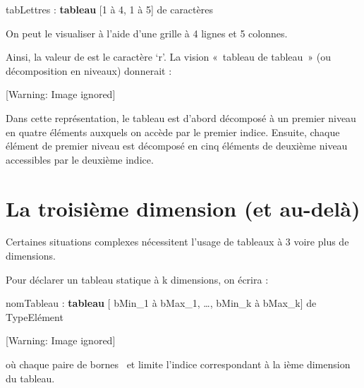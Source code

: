 {\sffamily
tabLettres : \textbf{tableau }[1 à 4, 1 à 5] de caractères}

{
On peut le visualiser à l’aide d’une grille à 4 lignes et 5 colonnes.}

{%
 \par}

{
Ainsi, la valeur de  est le caractère
‘r’. La vision «~tableau de tableau~» (ou décomposition en niveaux)
donnerait :}

  [Warning: Image ignored] %
 

{
Dans cette représentation, le tableau  est
d’abord décomposé à un premier niveau en quatre éléments auxquels on
accède par le premier indice. Ensuite, chaque élément de premier niveau
est décomposé en cinq éléments de deuxième niveau accessibles par le
deuxième indice.}

\section{La troisième dimension (et au-delà)}
{
Certaines situations complexes nécessitent l'usage de
tableaux à 3 voire plus de dimensions.}

{
Pour déclarer un tableau statique à k dimensions, on écrira :}

{\sffamily
nomTableau : \textbf{tableau} [ bMin\_1 à bMax\_1, …, bMin\_k à bMax\_k]
de TypeElément}

\begin{center}
 [Warning: Image ignored] %

\end{center}
{
où chaque paire de bornes ~et
 limite l’indice correspondant à la ième
dimension du tableau.}

